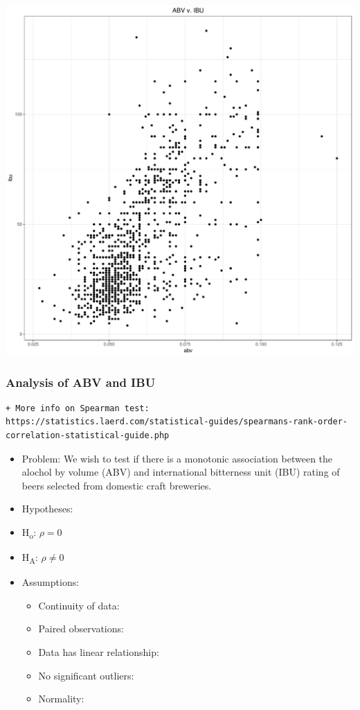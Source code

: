 \documentclass[]{article}
\providecommand{\tightlist}{%
  \setlength{\itemsep}{0pt}\setlength{\parskip}{0pt}}
\newcommand{\cmark}{\Large\textcolor{green}{\ding{52}}}
\newcommand{\xmark}{\Large\textcolor{red}{\ding{55}}}
\begin{document}
\begin{center}\includegraphics{Analysis_Final_files/figure-latex/unnamed-chunk-21-1} \end{center}

\subsubsection{Analysis of ABV and IBU}\label{analysis-of-abv-and-ibu}

\begin{verbatim}
+ More info on Spearman test: https://statistics.laerd.com/statistical-guides/spearmans-rank-order-correlation-statistical-guide.php
\end{verbatim}

\begin{itemize}
\item
  Problem: We wish to test if there is a monotonic association between
  the alochol by volume (ABV) and international bitterness unit (IBU)
  rating of beers selected from domestic craft breweries.
\item
  Hypotheses:
\item
  H\textsubscript{o}: \(\rho= 0\)
\item
  H\textsubscript{A}: \(\rho\neq 0\)
\item
  Assumptions:

  \begin{itemize}
  \tightlist
  \item
    Continuity of data: \cmark
  \item
    Paired observations: \cmark
  \item
    Data has linear relationship: \cmark
  \item
    No significant outliers: \xmark
  \item
    Normality: \xmark
  \end{itemize}
\end{itemize}
\end{document}
